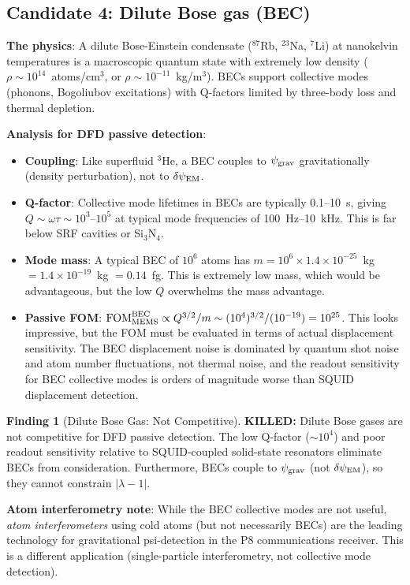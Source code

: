 \documentclass[11pt]{article}
\theoremstyle{definition}
\newtheorem{finding}[theorem]{Finding}
\theoremstyle{remark}
\newcommand{\ee}[1]{\times 10^{#1}}
\newcommand{\psigrav}{\psi_{\rm grav}}
\newcommand{\psiEM}{\delta\psi_{\rm EM}}
\newcommand{\FOMMEMS}{\mathrm{FOM}_{\rm MEMS}}
\newcommand{\killed}[1]{\textcolor{red!70!black}{\textbf{KILLED:} #1}}
\begin{document}
\subsection{Candidate 4: Dilute Bose gas (BEC)}
\label{sec:bec}

\textbf{The physics}: A dilute Bose-Einstein condensate
($^{87}$Rb, $^{23}$Na, $^{7}$Li) at nanokelvin temperatures is a
macroscopic quantum state with extremely low density
($\rho \sim 10^{14}$~atoms/cm$^3$, or $\rho \sim 10^{-11}$~kg/m$^3$).
BECs support collective modes (phonons, Bogoliubov excitations) with
Q-factors limited by three-body loss and thermal depletion.

\textbf{Analysis for DFD passive detection}:
\begin{itemize}[nosep]
  \item \textbf{Coupling}: Like superfluid $^3$He, a BEC couples to
    $\psigrav$ gravitationally (density perturbation), not to $\psiEM$.
  \item \textbf{Q-factor}: Collective mode lifetimes in BECs are
    typically 0.1--10~s, giving $Q \sim \omega\tau \sim 10^3$--$10^5$
    at typical mode frequencies of 100~Hz--10~kHz. This is far below
    SRF cavities or Si$_3$N$_4$.
  \item \textbf{Mode mass}: A typical BEC of $10^6$ atoms has
    $m = 10^6 \times 1.4\ee{-25}$~kg $= 1.4\ee{-19}$~kg $= 0.14$~fg.
    This is extremely low mass, which would be advantageous, but the
    low $Q$ overwhelms the mass advantage.
  \item \textbf{Passive FOM}: $\FOMMEMS^{\rm BEC} \propto Q^{3/2}/m
    \sim (10^4)^{3/2}/(10^{-19}) = 10^{25}$. This looks impressive,
    but the FOM must be evaluated in terms of actual displacement
    sensitivity. The BEC displacement noise is dominated by quantum
    shot noise and atom number fluctuations, not thermal noise, and
    the readout sensitivity for BEC collective modes is orders of
    magnitude worse than SQUID displacement detection.
\end{itemize}

\begin{finding}[Dilute Bose Gas: Not Competitive]
\label{find:bec}
\killed{Dilute Bose gases are not competitive for DFD passive detection.}
The low Q-factor ($\sim 10^4$) and poor readout sensitivity relative to
SQUID-coupled solid-state resonators eliminate BECs from consideration.
Furthermore, BECs couple to $\psigrav$ (not $\psiEM$), so they cannot
constrain $|\lambda-1|$.

\textbf{Atom interferometry note}: While the BEC collective modes are
not useful, \emph{atom interferometers} using cold atoms (but not
necessarily BECs) are the leading technology for gravitational
psi-detection in the P8 communications receiver. This is a different
application (single-particle interferometry, not collective mode
detection).
\end{finding}
\end{document}
